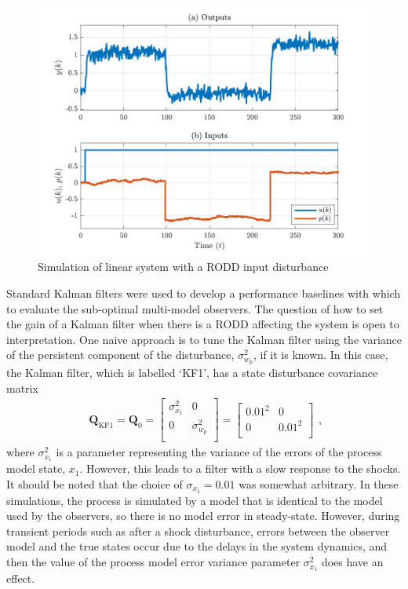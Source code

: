 \begin{figure}[htp]
	\centering
	\includegraphics[width=13cm]{images/rod_obs_sim1_ioplot.pdf}
	\caption{Simulation of linear system with a RODD input disturbance}
	\label{fig:rod-obs-sim1-ioplot}
\end{figure}
Standard Kalman filters were used to develop a performance baselines with which to evaluate the sub-optimal multi-model observers. The question of how to set the gain of a Kalman filter when there is a RODD affecting the system is open to interpretation. One naive approach is to tune the Kalman filter using the variance of the persistent component of the disturbance, $\sigma_{w_p}^2$, if it is known. In this case, the Kalman filter, which is labelled `KF1', has a state disturbance covariance matrix
\begin{equation} \label{eq:sim-sys-siso-KF1-Q}
	\begin{aligned}
		\mathbf{Q}_{\text{KF1}}=\mathbf{Q}_0=\begin{bmatrix}
			\sigma_{x_1}^2 & 0 \\
			0 &  \sigma_{w_p}^2 \\
		\end{bmatrix}=\begin{bmatrix}
		0.01^2 & 0 \\
		0 & 0.01^2 \\
	\end{bmatrix}
	\end{aligned},
\end{equation}
where $\sigma_{x_1}^2$ is a parameter representing the variance of the errors of the process model state, $x_1$. However, this leads to a filter with a slow response to the shocks. It should be noted that the choice of $\sigma_{x_1}=0.01$ was somewhat arbitrary. In these simulations, the process is simulated by a model that is identical to the model used by the observers, so there is no model error in steady-state. However, during transient periods such as after a shock disturbance, errors between the observer model and the true states occur due to the delays in the system dynamics, and then the value of the process model error variance parameter $\sigma_{x_1}^2$ does have an effect.

